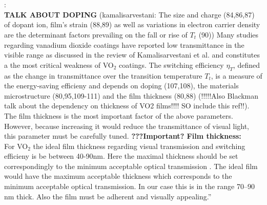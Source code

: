 %
\\
\\
\cite{Kamalisarvestani2013}:\\
\textbf{TALK ABOUT DOPING}
(kamalisarvestani: The size and charge (84,86,87) of dopant ion, film's strain (88,89) as well as
variations in electron carrier density are the determinant factors prevailing on the fall or rise of
$T_t$ (90))
%
Many studies regarding vanadium dioxide coatings have reported low transmittance in the visible range
as discussed in the review of Kamalisarvestani et al. \cite[p.358]{Kamalisarvestani2013} and 
constitutes a the most critical weakness of VO$_2$ coatings. The switching efficiency $\eta_T$,
defined as the change in transmittance over the transition temperature $T_t$, is a measure
of the energy-saving efficieny and depends on doping (107,108), the materials microstructure (80,95,109-111)
and the film thickness (80,88) (!!!!!Also Blackman \cite[p.~4569]{Blackman2009} talk about the dependency on
thickness of VO2 films!!!! SO include this ref!!). 
The film thickness is the most important factor of the above parameters. However, because increasing 
it would reduce the transmittance of visual light, this parameter must be carefully tuned.
%
\textbf{???Important? Film thickness:}\\
For VO$_2$ the ideal film thickness regarding visual transmission
and switching efficieny is be between 40-90nm. Here the maximal
thickness should be set correspondingly to the minimum acceptable optical transmission
\cite[p.~358]{Kamalisarvestani2013} 
\cite[p.~4569]{Blackman2009}.
The ideal film would have the maximum acceptable thickness which corresponds to the minimum 
acceptable optical transmission. In our case this is in the range 70–90 nm thick. Also
the film must be adherent and visually appealing.''

